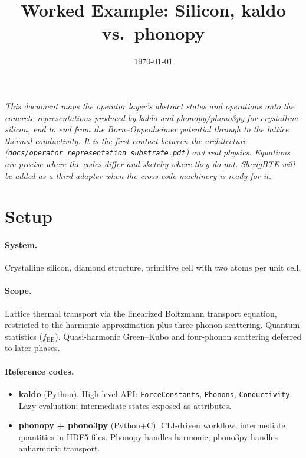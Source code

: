 \documentclass[11pt,a4paper]{article}
\title{Worked Example: Silicon, kaldo vs.\ phonopy}
\author{}
\date{\today}
\begin{document}
\maketitle

\noindent\emph{This document maps the operator layer's abstract states and operations onto the
concrete representations produced by kaldo and phonopy/phono3py for crystalline silicon, end
to end from the Born--Oppenheimer potential through to the lattice thermal conductivity. It
is the first contact between the architecture (\texttt{docs/operator\_representation\_substrate.pdf}) and real
physics. Equations are precise where the codes differ and sketchy where they do not.
ShengBTE will be added as a third adapter when the cross-code machinery is ready for it.}

\bigskip

\section{Setup}

\paragraph{System.} Crystalline silicon, diamond structure, primitive cell with two atoms per
unit cell.

\paragraph{Scope.} Lattice thermal transport via the linearized Boltzmann transport equation,
restricted to the harmonic approximation plus three-phonon scattering. Quantum statistics
($f_{\text{BE}}$). Quasi-harmonic Green--Kubo and four-phonon scattering deferred to later
phases.

\paragraph{Reference codes.}
\begin{itemize}[leftmargin=2em, itemsep=0pt]
  \item \textbf{kaldo} (Python). High-level API: \texttt{ForceConstants}, \texttt{Phonons},
        \texttt{Conductivity}. Lazy evaluation; intermediate states exposed as attributes.
  \item \textbf{phonopy + phono3py} (Python+C). CLI-driven workflow, intermediate quantities in
        HDF5 files. Phonopy handles harmonic; phono3py handles anharmonic transport.
\end{itemize}
\end{document}
